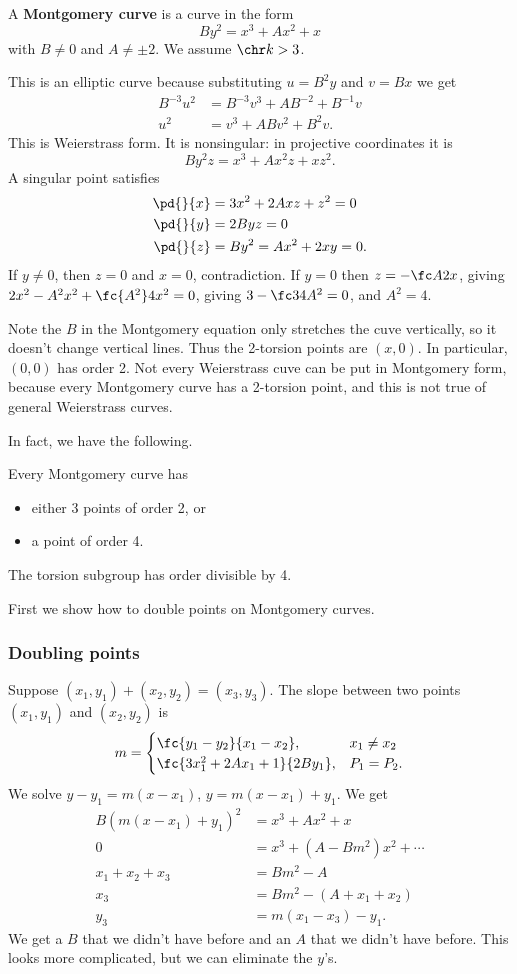 \begin{df}
A \textbf{Montgomery curve} is a curve in the form
\[
By^2=x^3+Ax^2+x
\]
with $B\ne 0$ and $A\ne \pm2$. We assume $\chr k>3$.
\end{df}
This is an elliptic curve because substituting $u=B^2y$ and $v=Bx$ we get
\begin{align*}
B^{-3}u^2&=B^{-3}v^3+AB^{-2}+B^{-1}v\\
u^2&=v^3+ABv^2+B^2v.
\end{align*}
This is Weierstrass form. It is nonsingular: in projective coordinates it is
\[
By^2z=x^3+Ax^2z+xz^2.
\]
A singular point satisfies
\begin{align*}
\pd{}{x}&=3x^2+2Axz+z^2=0\\
\pd{}{y}&=2Byz=0\\
\pd{}{z}&=By^2=Ax^2+2xy=0.
\end{align*}
If $y\ne 0$, then $z=0$ and $x=0$, contradiction. If $y=0$ then $z=-\fc A2x$, giving $2x^2-A^2x^2+\fc{A^2}4x^2=0$, giving $3-\fc 34 A^2=0$, and $A^2=4$.

Note the $B$ in the Montgomery equation only stretches the cuve vertically, so it doesn't change vertical lines. Thus the 2-torsion points are $(x,0)$. In particular, $(0,0)$ has order 2. Not every Weierstrass cuve can be put in Montgomery form, because every Montgomery curve has a 2-torsion point, and this is not true of general Weierstrass curves.

In fact, we have the following.
\begin{thm}
Every Montgomery curve has
\begin{itemize}
\item
either 3 points of order 2, or
\item a point of order 4.
\end{itemize}
The torsion subgroup has order divisible by 4.
\end{thm}
First we show how to double points on Montgomery curves.

\subsubsection{Doubling points}
Suppose $(x_1,y_1)+(x_2,y_2)=(x_3,y_3)$. The slope between two points $(x_1,y_1)$ and $(x_2,y_2)$ is
\[
m=\begin{cases}
\fc{y_1-y_2}{x_1-x_2},&x_1\ne x_2\\
\fc{3x_1^2+2Ax_1+1}{2By_1},&P_1=P_2.
\end{cases}
\]
We solve $y-y_1=m(x-x_1)$, $y=m(x-x_1)+y_1$. We get
\begin{align*}
B(m(x-x_1)+y_1)^2&=x^3+Ax^2+x\\
0&=x^3+(A-Bm^2)x^2+\cdots \\
x_1+x_2+x_3&=Bm^2-A\\
x_3&=Bm^2-(A+x_1+x_2)\\
y_3&=m(x_1-x_3)-y_1.
\end{align*}
We get a $B$ that we didn't have before and an $A$ that we didn't have before. This looks more complicated, but we can eliminate the $y$'s. %

